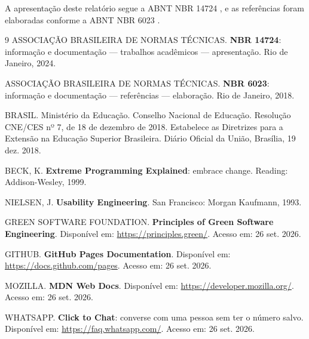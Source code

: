 \documentclass[12pt,a4paper]{article}
\begin{document}
A apresentação deste relatório segue a ABNT NBR 14724 \cite{abnt14724}, e as referências foram elaboradas conforme a ABNT NBR 6023 \cite{abnt6023}.

\begin{thebibliography}{9}
 ASSOCIAÇÃO BRASILEIRA DE NORMAS TÉCNICAS. \textbf{NBR 14724}: informação e documentação --- trabalhos acadêmicos --- apresentação. Rio de Janeiro, 2024.

 ASSOCIAÇÃO BRASILEIRA DE NORMAS TÉCNICAS. \textbf{NBR 6023}: informação e documentação --- referências --- elaboração. Rio de Janeiro, 2018.

 BRASIL. Ministério da Educação. Conselho Nacional de Educação. Resolução CNE/CES nº 7, de 18 de dezembro de 2018. Estabelece as Diretrizes para a Extensão na Educação Superior Brasileira. Diário Oficial da União, Brasília, 19 dez. 2018.

 BECK, K. \textbf{Extreme Programming Explained}: embrace change. Reading: Addison-Wesley, 1999.

 NIELSEN, J. \textbf{Usability Engineering}. San Francisco: Morgan Kaufmann, 1993.

 GREEN SOFTWARE FOUNDATION. \textbf{Principles of Green Software Engineering}. Disponível em: \url{https://principles.green/}. Acesso em: 26 set. 2026.

 GITHUB. \textbf{GitHub Pages Documentation}. Disponível em: \url{https://docs.github.com/pages}. Acesso em: 26 set. 2026.

 MOZILLA. \textbf{MDN Web Docs}. Disponível em: \url{https://developer.mozilla.org/}. Acesso em: 26 set. 2026.

 WHATSAPP. \textbf{Click to Chat}: converse com uma pessoa sem ter o número salvo. Disponível em: \url{https://faq.whatsapp.com/}. Acesso em: 26 set. 2026.
\end{thebibliography}
\end{document}
